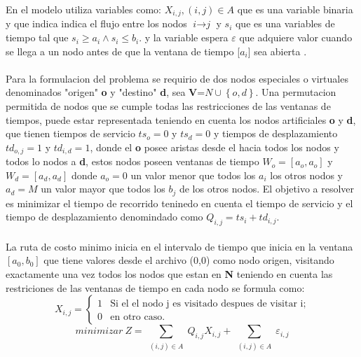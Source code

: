 \documentclass[journal, a4paper]{IEEEtran}
\begin{document}
En el modelo utiliza variables como: \(X_{i,j},  (i,j) \in A \)  que es una variable binaria 
y que indica indica el flujo entre los nodos \(\textit{i} \to \textit{j}\) y \(s_{i}\)
que es una variables de tiempo tal que \(s_{i} \geq a_{i} \wedge  s_{i} \leq b_{i} \). y
la variable espera \(\varepsilon \) que adquiere valor cuando se llega a un nodo antes de que la 
ventana de tiempo [\(a_{i}\)]  sea abierta .\\ \\
Para la formulacion del problema se requirio de dos nodos especiales o virtuales 
denominados "origen" \textbf{o} y "destino"  \textbf{d}, sea \textbf{V}=\( N\cup \left \{ o,d \right \}\). 
Una permutacion permitida de nodos que se cumple todas las restricciones de las ventanas de tiempos,
puede estar representada teniendo en cuenta los nodos artificiales \textbf{o} y \textbf{d}, 
que tienen tiempos de servicio \(ts_{o} =0\) y \(ts_{d}=0\)  y tiempos de desplazamiento 
\(td_{o,j} =1\) y \(td_{i,d}=1\), donde el \textbf{o} 
posee aristas desde el hacia todos los nodos y todos lo nodos a \textbf{d},
estos nodos poseen ventanas de tiempo \( W_{o}= [a_{o},a_{o}]\) y \( W_{d}= [a_{d},a_{d}]\) 
donde \(a_{o} = 0 \)  un valor menor que todos los \(a_{i}\) los otros nodos y 
\(a_{d} = M\) un valor mayor que todos los \(b_{j}\) de los otros nodos.
El objetivo a resolver es minimizar el tiempo de recorrido teninedo en cuenta el tiempo de servicio y
el tiempo de desplazamiento denomindado como \(  Q_{i,j} = ts_{i}+ td_{i,j} \). \\\\
La ruta de costo minimo  inicia en el intervalo de tiempo que inicia en la ventana
\(\left[ a_{0}, b_{0} \right]\) que tiene valores desde el archivo (0,0)
como nodo origen, visitando exactamente una vez todos los nodos \cite{tspdef} 
que estan en \textbf{N} teniendo en cuenta las restriciones de las ventanas 
de tiempo en cada nodo se formula como:
\[ X_{i,j} = \left\{ \begin{array}{ll}
         1 & \mbox{Si el el nodo j es visitado despues de visitar i};\\
         0 & \mbox{en otro caso}.\end{array} \right. \] 
\begin{equation} 
 minimizar \> Z= \sum_{\substack{(i,j)\in A}} Q_{i,j} X_{i,j} + \sum_{\substack{(i,j)\in A}} \varepsilon _{i,j}
\end{equation}
\end{document}
